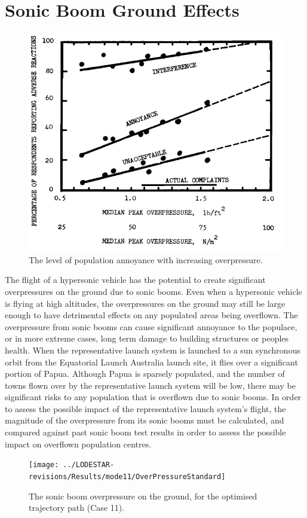 \section{Sonic Boom Ground Effects}
\begin{figure}[!ht]
	\centering
	\includegraphics[width=0.6\linewidth]{figures/6_FlyBack/OverPressureResponse}
	\caption{The level of population annoyance with increasing overpressure.}
	\label{fig:OverPressureResponse}
\end{figure}
\noindent
The flight of a hypersonic vehicle has the potential to create significant overpressures on the ground due to sonic booms. Even when a hypersonic vehicle is flying at high altitudes, the overpressures on the ground may still be large enough to have detrimental effects on any populated areas being overflown. The overpressure from sonic booms can cause significant annoyance to the populace, or in more extreme cases, long term damage to building structures or peoples health. 
When the representative launch system is launched to a sun synchronous orbit from the Equatorial Launch Australia launch site, it flies over a significant portion of Papua. Although Papua is sparsely populated, and the number of towns flown over by the representative launch system will be low, there may be significant risks to any population that is overflown due to sonic booms. In order to assess the possible impact of the representative launch system's flight, the magnitude of the overpressure from its sonic booms must be calculated, and compared against past sonic boom test results in order to assess the possible impact on overflown population centres. 
\begin{figure}[!ht]
	\centering
	\texttt{[image: ../LODESTAR-revisions/Results/mode11/OverPressureStandard]}
	\caption{The sonic boom overpressure on the ground, for the optimised trajectory path (Case 11).}
	\label{fig:OverPressureStandard}
\end{figure}
